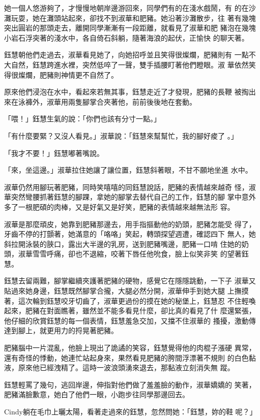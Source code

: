 她一個人悠游夠了，才慢慢地朝岸邊游回來，同學們有的在淺水戲鬧，有
的在沙灘玩耍，她在灘頭站起來，卻找不到淑華和肥豬。她沿著沙灘散步，往
著有幾塊突出圓岩的那頭走去，離開同學漸漸有一段距離，就看見了淑華和肥
豬泡在幾塊小岩石浮突著的淺水中，各自倚石斜躺，隨著海浪的起伏，正愉快
的聊天著。

鈺慧朝他們走過去，淑華看見她了，向她招呼並且笑得很燦爛，肥豬則有
一點不大自然，鈺慧跨進水裡，突然低啐了一聲，雙手插腰盯著他們瞪眼。淑
華依然笑得很燦爛，肥豬則神情更不自然了。

原來他們浸泡在水中，看起來若無其事，鈺慧走近了才發現，肥豬的長鞭
被掏出來在泳褲外，淑華用兩隻腳掌合夾著他，前前後後地在套動。

「喂！」鈺慧生氣的說：「你們也該有分寸一點。」

「有什麼要緊？又沒人看見。」淑華說：「鈺慧來幫幫忙，我的腳好痠了
。」

「我才不要！」鈺慧嘟著嘴說。

「來，坐這邊。」淑華拉住她讓了讓位置，鈺慧斜著眼，不甘不願地坐進
水中。

淑華仍然用腳玩著肥豬，同時笑嘻嘻的同鈺慧說話，肥豬的表情越來越奇
怪，淑華突然彎腰抓著鈺慧的腳踝，拿她的腳掌去替代自己的工作，鈺慧的腳
掌中意外多了一根肥碩的肉棒，又是好氣又是好笑，肥豬的表情越來越無法形
容。

淑華是那麼頑皮，她靠到肥豬那邊去，用手指摳動他的奶頭，肥豬怎能受
得了，牙齒不停的打顫著，她滿意的「咯咯」笑起，轉頭探望週遭，確認四下
無人，她斜拉開泳裝的脥口，露出大半邊的乳房，送到肥豬嘴邊，肥豬一口啃
住她的奶頭，淑華雪雪呼痛，卻也不退縮，咬著下唇任他吮食，臉上似笑非笑
的望著鈺慧。

鈺慧去留兩難，腳掌繼續夾護著肥豬的硬物，感覺它在隱隱跳動，一下子
淑華又貼過來她身邊，鈺慧既然腳掌合攏，大腿必然分開，淑華伸手到她大腿
上撫摸著，這次輪到鈺慧咬牙切齒了，淑華更過份的摸在她的秘堡上，鈺慧忍
不住輕喚起來，肥豬在對面瞧著，雖然並不能多看見什麼，卻比真的看見了什
麼還緊張，他仔細的欣賞鈺慧的每一個表情，鈺慧羞急交加，又擋不住淑華的
搔擾，激動傳達到腳上，就更用力的捋晃著肥豬。

肥豬腦中一片混亂，他臉上現出了詭譎的笑容，鈺慧覺得他的肉棍子漲硬
異常，還有奇怪的悸動，她連忙站起身來，果然看見肥豬的胯間浮漂著不規則
的白色黏液，原來他已經洩精了。這時一波浪頭湧來退去，那黏液立刻消失無
蹤。

鈺慧輕罵了幾句，逃回岸邊，伸指對他們做了羞羞臉的動作，淑華嬌嬌的
笑著，肥豬滿臉歉意，她白了他們一眼，小跑步往同學那邊回去。

Cindy躺在毛巾上曬太陽，看著走過來的鈺慧，忽然問她：「鈺慧，妳的鞋
呢？」

